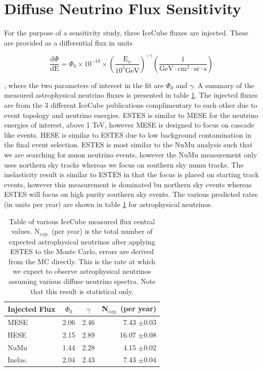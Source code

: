 \documentclass{PoS}
\begin{document}

\section{Diffuse Neutrino Flux Sensitivity}\label{sec:Diffuse}
For the purpose of a sensitivity study, three IceCube fluxes are injected. These are provided as a differential flux in units 

\begin{equation}
\frac{\mathrm{d}\Phi}{\mathrm{dE}} = \Phi_{0} \times 10^{-18} \times (\frac{\mathrm{E}_{\nu}}{10^{5} \mathrm{GeV}})^{-\gamma} (\frac{1}{\mathrm{GeV\cdot cm^{2}\cdot sr\cdot s}})
\end{equation}

, where the two parameters of interest in the fit are $\Phi_{0}$ and $\gamma$. 
A summary of the measured astrophysical neutrino fluxes is presented in table \ref{tab:fluxes}. The injected fluxes are from the 3 different IceCube publications complimentary to each other due to event topology and neutrino energies. ESTES is similar to MESE \cite{MESE:2year} for the neutrino energies of interest, above 1 TeV, however MESE is designed to focus on cascade like events. HESE \cite{Austin:HESE} is similar to ESTES due to low background contamination in the final event selection. ESTES is most similar to the NuMu analysis \cite{icrc:numu} such that we are searching for muon neutrino events, however the NuMu measurement only uses northern sky tracks whereas we focus on southern sky numu tracks. The inelasticity result \cite{inelas} is similar to ESTES in that the focus is placed on starting track events, however this measurement is dominated bu northern sky events whereas ESTES will focus on high purity southern sky events. The various predicted rates (in units per year) are shown in table \ref{tab:fluxes} for astrophysical neutrinos. 

\begin{table}[h!]
\centering 
\begin{tabular}{l|c|c|r}
\hline
Injected Flux & $\Phi_{0}$ & $\gamma$ & N$_{exp.}$ (per year) \\ \hline \hline 
MESE\cite{MESE:2year} & 2.06 & 2.46 & 7.43 $\pm0.03$ \\ \hline
HESE\cite{Austin:HESE} & 2.15 & 2.89 & 16.07 $\pm0.08$ \\ \hline
NuMu\cite{icrc:numu} & 1.44 & 2.28 & 4.15 $\pm0.02$ \\ \hline
Inelas.\cite{inelas} & 2.04 & 2.43 & 7.43 $\pm0.04$ \\ \hline
\end{tabular}
\caption{Table of various IceCube measured flux central values. N$_{exp.}$ (per year) is the total number of expected astrophysical neutrinos after applying ESTES to the Monte Carlo, errors are derived from the MC directly. This is the rate at which we expect to observe astrophysical neutrinos assuming various diffuse neutrino spectra. Note that this result is statistical only.}
\label{tab:fluxes}
\end{table}
\end{document}
